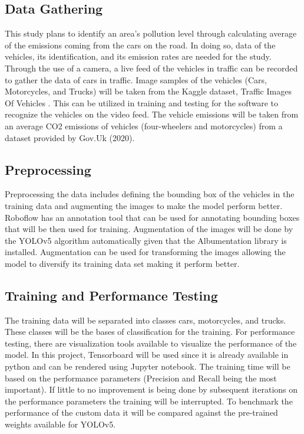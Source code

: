 \subsection {Data Gathering}
This study plans to identify an area’s pollution level through calculating average of the emissions coming from the cars on the road. In doing so, data of the vehicles, its identification, and its emission rates are needed for the study. Through the use of a camera, a live feed of the vehicles in traffic can be recorded to gather the data of cars in traffic. Image samples of the vehicles (Cars, Motorcycles, and Trucks) will be taken from the Kaggle dataset, Traffic Images Of Vehicles \cite{DVN/POREXF_2020}. This can be utilized in training and testing for the software to recognize the vehicles on the video feed. The vehicle emissions will be taken from an average CO2 emissions of vehicles (four-wheelers and motorcycles) from a dataset provided by Gov.Uk (2020). 

\subsection {Preprocessing}

	Preprocessing the data includes defining the bounding box of the vehicles in the training data and augmenting the images to make the model perform better. Roboflow has an annotation tool that can be used for annotating bounding boxes that will be then used for training. Augmentation of the images will be done by the YOLOv5 algorithm automatically given that the Albumentation library is installed. Augmentation can be used for transforming the images allowing the model to diversify its training data set making it perform better. 


\subsection {Training and Performance Testing}

The training data will be separated into classes cars, motorcycles, and trucks. These classes will be the bases of classification for the training.  For performance testing, there are visualization tools available to visualize the performance of the model. In this project, Tensorboard will be used since it is already available in python and can be rendered using Jupyter notebook. The training time will be based on the performance parameters (Precision and Recall being the most important). If little to no improvement is being done by subsequent iterations on the performance parameters the training will be interrupted. To benchmark the performance of the custom data it will be compared against the pre-trained weights available for YOLOv5. 


